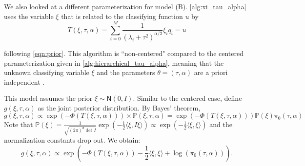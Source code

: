 \documentclass{siamart1116}
\begin{document}
        We also looked at a different parameterization for model (B). \cref{alg:xi_tau_alpha} uses the variable $\xi$ that is related to the classifying function $u$ by 
        \begin{equation}
        \label{eqn:noncentered_T}
        T(\xi,\tau,\alpha) = \sum_{i=0}^M \frac{1}{(\lambda_i+\tau^2)^{\alpha/2}}\xi_iq_i = u
        \end{equation}

        following \cref{eqn:prior}. This algorithm is ``non-centered" compared to the centered parameterization given in \cref{alg:hierarchical_tau_alpha}, meaning that the unknown classifying variable $\xi$ and the parameters $\theta=(\tau,\alpha)$ are a priori independent \cite{Noncentered}.

        This model assumes the prior $\xi \sim \mathsf{N}(0,I)$. Similar to the centered case, define $g(\xi,\tau,\alpha)$ as the joint posterior distribution. By Bayes' theorem, 
        \[g(\xi,\tau,\alpha) \propto \exp(-\Phi(T(\xi,\tau,\alpha)))\times \mathbb{P}(\xi,\tau,\alpha) = \exp(-\Phi(T(\xi,\tau,\alpha)))\mathbb{P}(\xi)\pi_0(\tau, \alpha)\]
        Note that $\mathbb{P}(\xi) = \frac{1}{\sqrt{(2\pi)^d \det I}} \exp(-\frac{1}{2}\langle \xi, I\xi  \rangle) \propto \exp(-\frac{1}{2}\langle \xi,\xi \rangle)$ and the normalization constants drop out. We obtain:
        \begin{equation}
        \label{eqn:noncentered_post}
        g(\xi,\tau,\alpha) \propto \exp\left( -\Phi(T(\xi,\tau,\alpha))-\frac{1}{2}\langle \xi,\xi \rangle + \log(\pi_0(\tau,\alpha)) \right).
        \end{equation}
\end{document}
